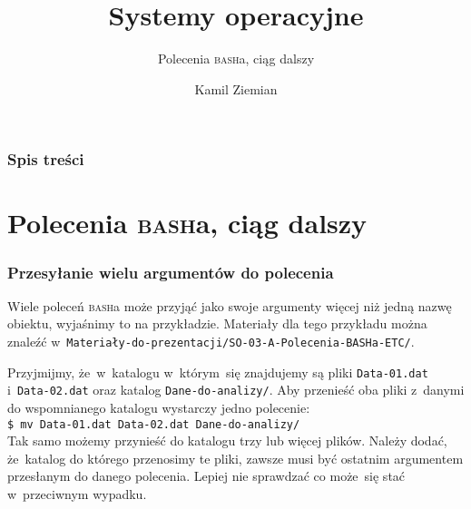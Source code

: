 \documentclass[10pt,t]{beamer}
\title{Systemy operacyjne}
\subtitle{Polecenia \textsc{bash}a, ciąg dalszy}
\author{Kamil Ziemian \\
  \email}
\begin{document}





\RaggedRight





\maketitle





\begin{frame}
  \frametitle{Spis treści}


  \tableofcontents

\end{frame}




















\section{Polecenia \textsc{bash}a, ciąg dalszy}


\begin{frame}
  \frametitle{Przesyłanie wielu argumentów do polecenia}


  Wiele poleceń \textsc{bash}a może przyjąć jako swoje argumenty więcej
  niż jedną nazwę obiektu, wyjaśnimy to na przykładzie. Materiały
  dla tego przykładu można znaleźć
  w~\texttt{Materiały-do-prezentacji/SO-03-A-Polecenia-BASHa-ETC/}.

  Przyjmijmy, że~w~katalogu w~którym~się znajdujemy są pliki
  \texttt{Data-01.dat} i~\texttt{Data-02.dat} oraz katalog
  \texttt{Dane-do-analizy/}. Aby przenieść oba pliki z~danymi do
  wspomnianego katalogu wystarczy jedno polecenie: \\
  \texttt{\$ mv Data-01.dat Data-02.dat Dane-do-analizy/} \\
  Tak samo możemy przynieść do katalogu trzy lub więcej plików. Należy
  dodać, że~katalog do którego przenosimy te pliki, \alert{zawsze}
  musi być ostatnim argumentem przesłanym do danego polecenia. Lepiej nie
  sprawdzać co może~się stać w~przeciwnym wypadku.

\end{frame}
\end{document}
